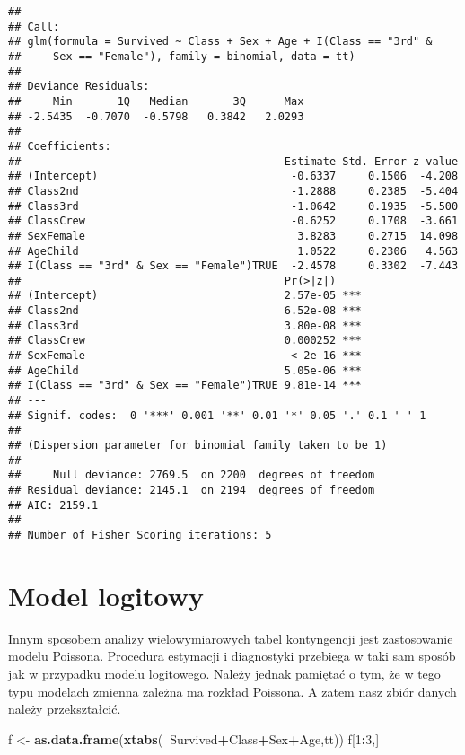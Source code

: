 \documentclass[polish,]{book}
\newenvironment{Shaded}{\begin{snugshade}}{\end{snugshade}}
\newcommand{\DecValTok}[1]{\textcolor[rgb]{0.00,0.00,0.81}{#1}}
\newcommand{\KeywordTok}[1]{\textcolor[rgb]{0.13,0.29,0.53}{\textbf{#1}}}
\newcommand{\NormalTok}[1]{#1}
\newcommand{\OperatorTok}[1]{\textcolor[rgb]{0.81,0.36,0.00}{\textbf{#1}}}
\newcommand{\StringTok}[1]{\textcolor[rgb]{0.31,0.60,0.02}{#1}}
\begin{document}
\begin{verbatim}
## 
## Call:
## glm(formula = Survived ~ Class + Sex + Age + I(Class == "3rd" & 
##     Sex == "Female"), family = binomial, data = tt)
## 
## Deviance Residuals: 
##     Min       1Q   Median       3Q      Max  
## -2.5435  -0.7070  -0.5798   0.3842   2.0293  
## 
## Coefficients:
##                                         Estimate Std. Error z value
## (Intercept)                              -0.6337     0.1506  -4.208
## Class2nd                                 -1.2888     0.2385  -5.404
## Class3rd                                 -1.0642     0.1935  -5.500
## ClassCrew                                -0.6252     0.1708  -3.661
## SexFemale                                 3.8283     0.2715  14.098
## AgeChild                                  1.0522     0.2306   4.563
## I(Class == "3rd" & Sex == "Female")TRUE  -2.4578     0.3302  -7.443
##                                         Pr(>|z|)    
## (Intercept)                             2.57e-05 ***
## Class2nd                                6.52e-08 ***
## Class3rd                                3.80e-08 ***
## ClassCrew                               0.000252 ***
## SexFemale                                < 2e-16 ***
## AgeChild                                5.05e-06 ***
## I(Class == "3rd" & Sex == "Female")TRUE 9.81e-14 ***
## ---
## Signif. codes:  0 '***' 0.001 '**' 0.01 '*' 0.05 '.' 0.1 ' ' 1
## 
## (Dispersion parameter for binomial family taken to be 1)
## 
##     Null deviance: 2769.5  on 2200  degrees of freedom
## Residual deviance: 2145.1  on 2194  degrees of freedom
## AIC: 2159.1
## 
## Number of Fisher Scoring iterations: 5
\end{verbatim}

\hypertarget{part_84}{%
\section{Model logitowy}\label{part_84}}

Innym sposobem analizy wielowymiarowych tabel kontyngencji jest zastosowanie
modelu Poissona. Procedura estymacji i diagnostyki przebiega w taki sam sposób
jak w przypadku modelu logitowego. Należy jednak pamiętać o tym, że w tego typu
modelach zmienna zależna ma rozkład Poissona. A zatem nasz zbiór danych należy
przekształcić.

\begin{Shaded}
\begin{Highlighting}[]
\NormalTok{f <-}\StringTok{ }\KeywordTok{as.data.frame}\NormalTok{(}\KeywordTok{xtabs}\NormalTok{(}\OperatorTok{~}\NormalTok{Survived}\OperatorTok{+}\NormalTok{Class}\OperatorTok{+}\NormalTok{Sex}\OperatorTok{+}\NormalTok{Age,tt))}
\NormalTok{f[}\DecValTok{1}\OperatorTok{:}\DecValTok{3}\NormalTok{,]}
\end{Highlighting}
\end{Shaded}
\end{document}
